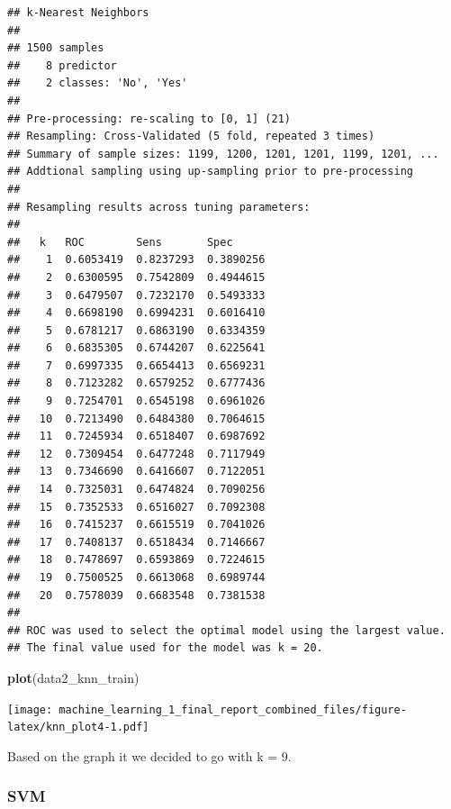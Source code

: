 \documentclass[
]{article}
\newenvironment{Shaded}{\begin{snugshade}}{\end{snugshade}}
\newcommand{\DecValTok}[1]{\textcolor[rgb]{0.00,0.00,0.81}{#1}}
\newcommand{\KeywordTok}[1]{\textcolor[rgb]{0.13,0.29,0.53}{\textbf{#1}}}
\newcommand{\NormalTok}[1]{#1}
\newcommand{\OperatorTok}[1]{\textcolor[rgb]{0.81,0.36,0.00}{\textbf{#1}}}
\newcommand{\StringTok}[1]{\textcolor[rgb]{0.31,0.60,0.02}{#1}}
\begin{document}
\begin{verbatim}
## k-Nearest Neighbors 
## 
## 1500 samples
##    8 predictor
##    2 classes: 'No', 'Yes' 
## 
## Pre-processing: re-scaling to [0, 1] (21) 
## Resampling: Cross-Validated (5 fold, repeated 3 times) 
## Summary of sample sizes: 1199, 1200, 1201, 1201, 1199, 1201, ... 
## Addtional sampling using up-sampling prior to pre-processing
## 
## Resampling results across tuning parameters:
## 
##   k   ROC        Sens       Spec     
##    1  0.6053419  0.8237293  0.3890256
##    2  0.6300595  0.7542809  0.4944615
##    3  0.6479507  0.7232170  0.5493333
##    4  0.6698190  0.6994231  0.6016410
##    5  0.6781217  0.6863190  0.6334359
##    6  0.6835305  0.6744207  0.6225641
##    7  0.6997335  0.6654413  0.6569231
##    8  0.7123282  0.6579252  0.6777436
##    9  0.7254701  0.6545198  0.6961026
##   10  0.7213490  0.6484380  0.7064615
##   11  0.7245934  0.6518407  0.6987692
##   12  0.7309454  0.6477248  0.7117949
##   13  0.7346690  0.6416607  0.7122051
##   14  0.7325031  0.6474824  0.7090256
##   15  0.7352533  0.6516027  0.7092308
##   16  0.7415237  0.6615519  0.7041026
##   17  0.7408137  0.6518434  0.7146667
##   18  0.7478697  0.6593869  0.7224615
##   19  0.7500525  0.6613068  0.6989744
##   20  0.7578039  0.6683548  0.7381538
## 
## ROC was used to select the optimal model using the largest value.
## The final value used for the model was k = 20.
\end{verbatim}

\begin{Shaded}
\begin{Highlighting}[]
\KeywordTok{plot}\NormalTok{(data2_knn_train)}
\end{Highlighting}
\end{Shaded}

\texttt{[image: machine\_learning\_1\_final\_report\_combined\_files/figure-latex/knn\_plot4-1.pdf]}

Based on the graph it we decided to go with k = 9.

\begin{Shaded}
\end{Shaded}

\hypertarget{svm}{%
\subsubsection{SVM}\label{svm}}
\end{document}
